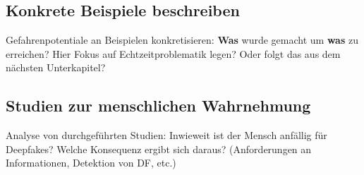 \subsection{Konkrete Beispiele beschreiben}
Gefahrenpotentiale an Beispielen konkretisieren: \textbf{Was} wurde gemacht um \textbf{was} zu erreichen?
Hier Fokus auf Echtzeitproblematik legen? Oder folgt das aus dem nächsten Unterkapitel?
\subsection{Studien zur menschlichen Wahrnehmung}
Analyse von durchgeführten Studien: Inwieweit ist der Mensch anfällig für Deepfakes?
Welche Konsequenz ergibt sich daraus? (Anforderungen an Informationen, Detektion von DF, etc.)